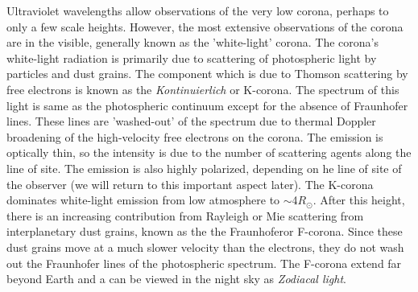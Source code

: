Ultraviolet wavelengths allow observations of the very low corona, perhaps to only a few scale heights. However, the most extensive observations of the corona are in the visible, generally known as the 'white-light' corona. The corona's white-light radiation is primarily due to scattering of photospheric light by particles and dust grains. The component which is due to Thomson scattering by free electrons is known as the {\it Kontinuierlich} or K-corona. The spectrum of this light is same as the photospheric continuum except for the absence of Fraunhofer lines. These lines are 'washed-out' of the spectrum due to thermal Doppler broadening of the high-velocity free electrons on the corona. The emission is optically thin, so the intensity is due to the number of scattering agents along the line of site. The emission is also highly polarized, depending on he line of site of the observer (we will return to this important aspect later). The K-corona dominates white-light emission from low atmosphere to $\sim$4$R_{\odot}$. After this height, there is an increasing contribution from Rayleigh or Mie scattering from interplanetary dust grains, known as the the Fraunhoferor F-corona. Since these dust grains move at a much slower velocity than the electrons, they do not wash out the Fraunhofer lines of the photospheric spectrum. The F-corona extend far beyond Earth and a can be viewed in the night sky as {\it Zodiacal light}.

